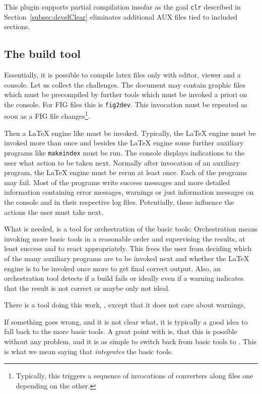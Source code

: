 This plugin supports partial compilation 
insofar as the goal \texttt{clr} described in Section~\ref{subsec:develClear} 
eliminates additional AUX files tied to included sections. 


\subsection{The build tool }\label{subsec:develLatexmk}

Essentially, it is possible to compile latex files 
only with editor, viewer and a console. 
Let us collect the challenges. 
The document may contain graphic files 
which must be precompiled by further tools 
which must be invoked a priori on the console. 
For FIG files this is \texttt{fig2dev}. 
This invocation must be repeated as soon as a FIG file changes\footnote%
{Typically, this triggers a sequence of invocations of converters 
along files one depending on the other. }. 

Then a \LaTeX{} engine like \lualatex{} must be invoked. 
Typically, the \LaTeX{} engine must be invoked more than once 
and besides the \LaTeX{} engine 
some further auxiliary programs like \texttt{makeindex} must be run. 
The console displays indications to the user what action to be taken next. 
Normally after invocation of an auxiliary program, 
the \LaTeX{} engine must be rerun at least once. 
Each of the programs may fail. 
Most of the programs write success messages and more detailed information 
containing error messages, warnings or just information messages 
on the console and in their respective log files. 
Potentially, these influence the actions the user must take next. 
\smallskip

What is needed, is a tool for orchestration 
of the basic tools: 
Orchestration means invoking more basic tools in a reasonable order 
and supervising the results, at least success and to react appropriately. 
This frees the user from deciding 
which of the many auxiliary programs are to be invoked next 
and whether the \LaTeX{} engine is to be invoked once more 
to get final correct output. 
Also, an orchestration tool detects if a build fails 
or ideally even if a warning indicates 
that the result is not correct or maybe only not ideal. 

There is a tool doing this work, , 
except that it does not care about warnings. 

If something goes wrong, and it is not clear what, 
it is typically a good idea to fall back to the more basic tools. 
A great point with  is, 
that this is possible without any problem, 
and it is as simple to switch back from basic tools to . 
This is what we mean saying that  
\emph{integrates} the basic tools. 

